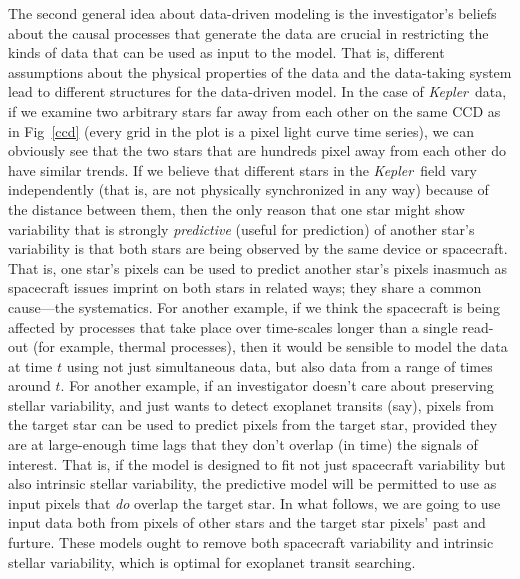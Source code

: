 \documentclass[12pt, preprint]{aastex}
\newcommand{\project}[1]{\textsl{#1}}
\newcommand{\Kepler}{\project{Kepler}}
\begin{document}
The second general idea about data-driven modeling is the investigator's beliefs
  about the causal processes that generate the data
  are crucial in restricting the kinds of data that can be used as input to the model.
That is, different assumptions about the physical properties of the data
  and the data-taking system
  lead to different structures for the data-driven model.
In the case of \Kepler\ data, if we examine two arbitrary stars far away from each other 
on the same CCD as in Fig~\ref{ccd} (every grid in the plot is a pixel light curve time 
series), we can obviously see that the two stars that are hundreds pixel away from each 
other do have similar trends. If we believe that different stars in the \Kepler\ field vary 
independently (that is, are not physically synchronized in any way) because of the 
distance between them, then the only reason that one star might show variability that is strongly \emph{predictive} (useful for prediction) of another star's variability
  is that both stars are being observed by the same device or spacecraft.
That is, one star's pixels can be used to predict another star's pixels
  inasmuch as spacecraft issues imprint on both stars in related ways;
  they share a common cause---the systematics.  
For another example, if we think the spacecraft is being affected by
  processes that take place over time-scales longer than a single read-out
  (for example, thermal processes),
  then it would be sensible to model the data at time $t$ using not just simultaneous data, but also data from a range of times around $t$.
For another example, if an investigator doesn't care about preserving stellar variability,
  and just wants to detect exoplanet transits (say),
  pixels from the target star can be used to predict pixels from the target star,
  provided they are at large-enough time lags that they don't overlap (in time)
  the signals of interest.
That is, if the model is designed to fit not just spacecraft variability
  but also intrinsic stellar variability,
  the predictive model will be permitted to use as input pixels that \emph{do} overlap the 
  target star.
In what follows, we are going to use input data both from pixels of other stars and the  
target star pixels' past and furture.
These models ought to remove both spacecraft variability and intrinsic stellar variability, 
which is optimal for exoplanet transit searching.
\end{document}
